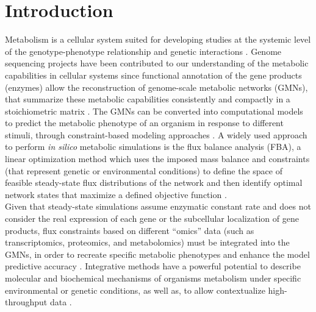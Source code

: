 \section{Introduction}
Metabolism is a cellular system suited for developing studies at the systemic level of the genotype-phenotype relationship and genetic interactions \cite{szappanos2011integrated}. Genome sequencing projects have been contributed to our understanding of the metabolic capabilities in cellular systems since functional annotation of the gene products (enzymes) allow the reconstruction of genome-scale metabolic networks (GMNs), that summarize these metabolic capabilities consistently and compactly in a stoichiometric matrix \cite{price2004genome,liu2010use}. The GMNs can be converted into computational models to predict the metabolic phenotype of an organism in response to different stimuli, through constraint-based modeling approaches \cite{schellenberger2011quantitative,seaver2012frontiers}. A widely used approach to perform \emph{in silico} metabolic simulations is the flux balance analysis (FBA), a linear optimization method which uses the imposed mass balance and constraints (that represent genetic or environmental conditions) to define the space of feasible steady-state flux distributions of the network and then identify optimal network states that maximize a defined objective function \cite{varma1994metabolic, szappanos2011integrated}.\\

Given that steady-state simulations assume enzymatic constant rate and does not consider the real expression of each gene or the subcellular localization of gene products, flux constraints based on different “omics” data (such as transcriptomics, proteomics, and metabolomics) must be integrated into the GMNs, in order to recreate specific metabolic phenotypes and enhance the model predictive accuracy \cite{palsson2002silico, chen2012metabolic, lewis2012constraining,topfer2013integration}. Integrative methods have a powerful potential to describe molecular and biochemical mechanisms of organisms metabolism under specific environmental or genetic conditions, as well as, to allow contextualize high-throughput data \cite{Oberhardt2009}.\\

